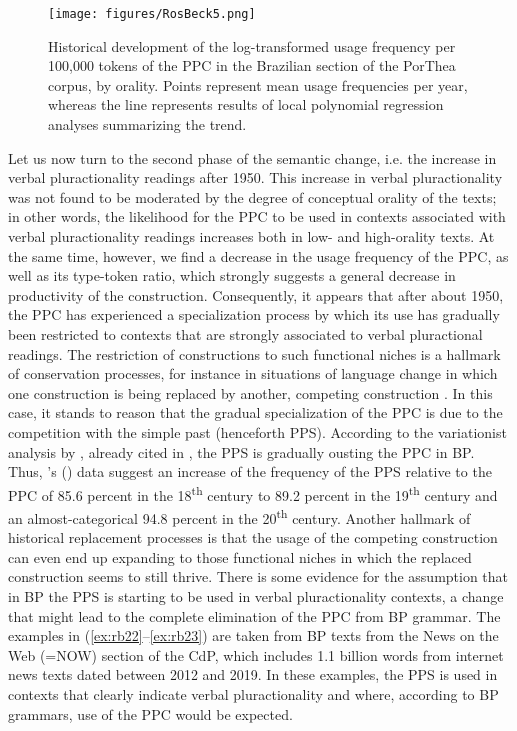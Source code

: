 \documentclass[output=paper,colorlinks,citecolor=brown]{langscibook}
\begin{document}
\begin{figure}
\texttt{[image: figures/RosBeck5.png]}
\caption{Historical development of the log-transformed usage frequency per 100,000 tokens of the PPC in the Brazilian section of the PorThea corpus, by orality. Points represent mean usage frequencies per year, whereas the line represents results of local polynomial regression analyses summarizing the trend.}
\label{fig:rb5}
\end{figure}

Let us now turn to the second phase of the semantic change, i.e. the increase in verbal pluractionality readings after 1950. This increase in verbal pluractionality was not found to be moderated by the degree of conceptual orality of the texts; in other words, the likelihood for the PPC to be used in contexts associated with verbal pluractionality readings increases both in low- and high-orality texts. At the same time, however, we find a decrease in the usage frequency of the PPC, as well as its type-token ratio, which strongly suggests a general decrease in productivity of the construction. Consequently, it appears that after about 1950, the PPC has experienced a specialization process by which its use has gradually been restricted to contexts that are strongly associated to verbal pluractional readings. The restriction of constructions to such functional niches is a hallmark of conservation processes, for instance in situations of language change in which one construction is being replaced by another, competing construction \parencite[see][]{Rosemeyer2016b}. In this case, it stands to reason that the gradual specialization of the PPC is due to the competition with the simple past (henceforth PPS). According to the variationist analysis by \citet{Barbosa2014}, already cited in  , the PPS is gradually ousting the PPC in BP. Thus, \citeauthor{Barbosa2014}’s (\citeyear{Barbosa2014}) data suggest an increase of the frequency of the PPS relative to the PPC of 85.6 percent in the 18\textsuperscript{th} century to 89.2 percent in the 19\textsuperscript{th} century and an almost-categorical 94.8 percent in the 20\textsuperscript{th} century. Another hallmark of historical replacement processes is that the usage of the competing construction can even end up expanding to those functional niches in which the replaced construction seems to still thrive. There is some evidence for the assumption that in BP the PPS is starting to be used in verbal pluractionality contexts, a change that might lead to the complete elimination of the PPC from BP grammar. The examples in (\ref{ex:rb22}--\ref{ex:rb23}) are taken from BP texts from the News on the Web (=NOW) section of the CdP, which includes 1.1 billion words from internet news texts dated between 2012 and 2019. In these examples, the PPS is used in contexts that clearly indicate verbal pluractionality and where, according to BP grammars, use of the PPC would be expected.
\end{document}
